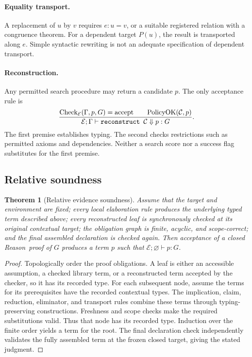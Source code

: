 \documentclass[11pt,a4paper]{article}
\newcommand{\Reason}{\textsf{Reason}}
\newcommand{\code}[1]{\texttt{\detokenize{#1}}}
\newcommand{\Env}{\mathcal E}
\newcommand{\KernelCheck}{\operatorname{Check}}
\newtheorem{theorem}{Theorem}[section]
\theoremstyle{remark}
\begin{document}
\paragraph{Equality transport.} A replacement of \(u\) by \(v\) requires \(e:u=v\), or a suitable registered relation with a congruence theorem. For a dependent target \(P(u)\), the result is transported along \(e\). Simple syntactic rewriting is not an adequate specification of dependent transport.

\paragraph{Reconstruction.} Any permitted search procedure may return a candidate \(p\). The only acceptance rule is
\[
 \frac{\KernelCheck_{\Env}(\Gamma,p,G)=\mathrm{accept}
       \qquad \mathrm{PolicyOK}(\mathcal C,p)}
      {\Env;\Gamma\vdash\code{reconstruct }\mathcal C\Downarrow p:G}.
\]
The first premise establishes typing. The second checks restrictions such as permitted axioms and dependencies. Neither a search score nor a success flag substitutes for the first premise.

\subsection{Relative soundness}

\begin{theorem}[Relative evidence soundness]\label{thm:soundness}
Assume that the target and environment are fixed; every local elaboration rule produces the underlying typed term described above; every reconstructed leaf is synchronously checked at its original contextual target; the obligation graph is finite, acyclic, and scope-correct; and the final assembled declaration is checked again. Then acceptance of a closed \Reason\ proof of \(G\) produces a term \(p\) such that \(\Env;\varnothing\vdash p:G\).
\end{theorem}
\begin{proof}
Topologically order the proof obligations. A leaf is either an accessible assumption, a checked library term, or a reconstructed term accepted by the checker, so it has its recorded type. For each subsequent node, assume the terms for its prerequisites have the recorded contextual types. The implication, claim, reduction, eliminator, and transport rules combine these terms through typing-preserving constructions. Freshness and scope checks make the required substitutions valid. Thus that node has its recorded type. Induction over the finite order yields a term for the root. The final declaration check independently validates the fully assembled term at the frozen closed target, giving the stated judgment.
\end{proof}
\end{document}
